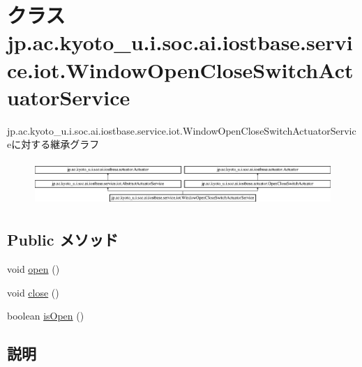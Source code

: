 \hypertarget{classjp_1_1ac_1_1kyoto__u_1_1i_1_1soc_1_1ai_1_1iostbase_1_1service_1_1iot_1_1_window_open_close_switch_actuator_service}{\section{クラス jp.\-ac.\-kyoto\-\_\-u.\-i.\-soc.\-ai.\-iostbase.\-service.\-iot.\-Window\-Open\-Close\-Switch\-Actuator\-Service}
\label{classjp_1_1ac_1_1kyoto__u_1_1i_1_1soc_1_1ai_1_1iostbase_1_1service_1_1iot_1_1_window_open_close_switch_actuator_service}
}
jp.\-ac.\-kyoto\-\_\-u.\-i.\-soc.\-ai.\-iostbase.\-service.\-iot.\-Window\-Open\-Close\-Switch\-Actuator\-Serviceに対する継承グラフ\begin{figure}[H]
\begin{center}
\leavevmode
\includegraphics[height=1.700405cm]{classjp_1_1ac_1_1kyoto__u_1_1i_1_1soc_1_1ai_1_1iostbase_1_1service_1_1iot_1_1_window_open_close_switch_actuator_service}
\end{center}
\end{figure}
\subsection*{Public メソッド}
\begin{DoxyCompactItemize}
\item 
void \hyperlink{classjp_1_1ac_1_1kyoto__u_1_1i_1_1soc_1_1ai_1_1iostbase_1_1service_1_1iot_1_1_window_open_close_switch_actuator_service_af964501857a175cd4abf3e85bc904eff}{open} ()
\item 
void \hyperlink{classjp_1_1ac_1_1kyoto__u_1_1i_1_1soc_1_1ai_1_1iostbase_1_1service_1_1iot_1_1_window_open_close_switch_actuator_service_aabfd536f5e10eb391cdeaadc5f5cb72b}{close} ()
\item 
boolean \hyperlink{classjp_1_1ac_1_1kyoto__u_1_1i_1_1soc_1_1ai_1_1iostbase_1_1service_1_1iot_1_1_window_open_close_switch_actuator_service_ad93f1504bc235e878d350dfbc6ca1f8c}{is\-Open} ()
\end{DoxyCompactItemize}


\subsection{説明}


